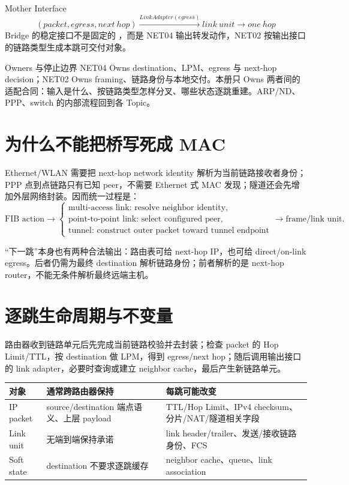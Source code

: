 \documentclass[UTF8,fontset=none,11pt,a4paper]{ctexart}
\begin{document}

\begin{corebox}{Mother Interface}
\[
\boxed{(packet,egress,next\ hop)\xrightarrow{LinkAdapter(egress)}link\ unit\to one\ hop}
\]
Bridge 的稳定接口不是固定的 ，而是 NET04 输出转发动作，NET02 按输出接口的链路类型生成本跳可交付对象。
\end{corebox}

\begin{methodbox}{Owners 与停止边界}
NET04 Owns destination、LPM、egress 与 next-hop decision；NET02 Owns framing、链路身份与本地交付。本册只 Owns 两者间的适配合同：输入是什么、按链路类型怎样分叉、哪些状态逐跳重建。ARP/ND、PPP、switch 的内部流程回到各 Topic。
\end{methodbox}

\section{为什么不能把桥写死成 MAC}

Ethernet/WLAN 需要把 next-hop network identity 解析为当前链路接收者身份；PPP 点到点链路只有已知 peer，不需要 Ethernet 式 MAC 发现；隧道还会先增加外层网络封装。因而统一过程是：
\[
\text{FIB action}\to
\begin{cases}
\text{multi-access link: resolve neighbor identity},\\
\text{point-to-point link: select configured peer},\\
\text{tunnel: construct outer packet toward tunnel endpoint}
\end{cases}
\to\text{frame/link unit}.
\]

“下一跳”本身也有两种合法输出：路由表可给 next-hop IP，也可给 direct/on-link egress。后者仍需为最终 destination 解析链路身份；前者解析的是 next-hop router，不能无条件解析最终远端主机。

\section{逐跳生命周期与不变量}

路由器收到链路单元后先完成当前链路校验并去封装；检查 packet 的 Hop Limit/TTL，按 destination 做 LPM，得到 egress/next hop；随后调用输出接口的 link adapter，必要时查询或建立 neighbor cache，最后产生新链路单元。

\begin{center}\small
\begin{tabularx}{\linewidth}{L{2.5cm}Y Y}
\toprule
对象 & 通常跨路由器保持 & 每跳可能改变\\
\midrule
IP packet & source/destination 端点语义、上层 payload & TTL/Hop Limit、IPv4 checksum、分片/NAT/隧道相关字段\\
Link unit & 无端到端保持承诺 & link header/trailer、发送/接收链路身份、FCS\\
Soft state & destination 不要求逐跳缓存 & neighbor cache、queue、link association\\
\bottomrule
\end{tabularx}
\end{center}
\end{document}

